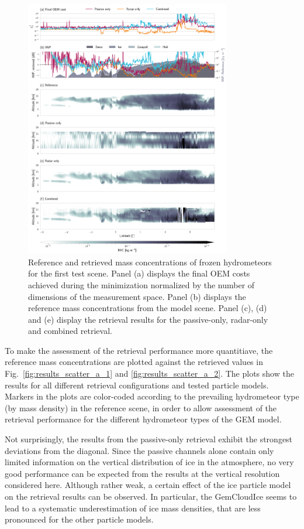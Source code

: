 \documentclass[journal abbreviation, manuscript]{copernicus}
\begin{document}
\begin{figure}
\centering
\includegraphics[width = 0.8\textwidth]{../plots/results_a_LargePlateAggregate}
\caption{Reference and retrieved mass concentrations of frozen hydrometeors for
 the first test scene. Panel (a) displays the final OEM costs achieved during
 the minimization normalized by the number of dimensions of the measurement
 space. Panel (b) displays the reference mass concentrations from the model
 scene. Panel (c), (d) and (e) display the retrieval results for the
 passive-only, radar-only and combined retrieval.}
\label{fig:results_a}
\end{figure}

To make the assessment of the retrieval performance more quantitiave, the
reference mass concentrations are plotted against the retrieved values in
Fig.~\ref{fig:results_scatter_a_1} and \ref{fig:results_scatter_a_2}. The plots
show the results for all different retrieval configurations and tested
particle models. Markers in the plots are color-coded according to the
prevailing hydrometeor type (by mass density) in the reference scene, in order
to allow assessment of the retrieval performance for the different hydrometeor
types of the GEM model.

Not surprisingly, the results from the passive-only retrieval exhibit the
strongest deviations from the diagonal. Since the passive channels alone contain
only limited information on the vertical distribution of ice in the atmosphere,
no very good performance can be expected from the results at the vertical
resolution considered here. Although rather weak, a certain effect of the 
ice particle model on the retrieval results can be observed. In particular, the
GemCloudIce seems to lead to a systematic underestimation of ice mass densities,
that are less pronounced for the other particle models.
\end{document}
